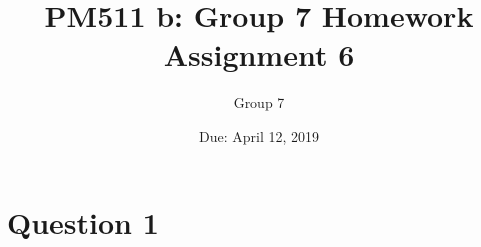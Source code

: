\documentclass{article}
\title{PM511 b: Group 7 Homework Assignment 6}
\author{Group 7}
\date{Due: April 12, 2019}
\begin{document}
\selectfont

\maketitle

\section{Question 1}
\end{document}
